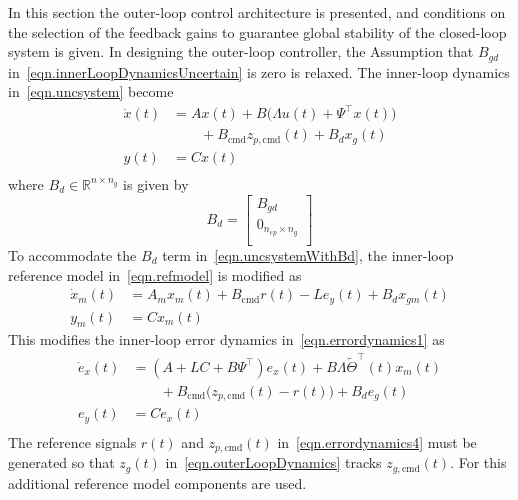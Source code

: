 \documentclass[journal]{IEEEtran}
\theoremstyle{innercustomthm}
\begin{document}
  In this section the outer-loop control architecture is presented, and conditions on the selection of the feedback gains to guarantee global stability of the closed-loop system is given.
  In designing the outer-loop controller, the Assumption that $B_{gd}$ in\ \eqref{eqn.innerLoopDynamicsUncertain} is zero is relaxed.
  The inner-loop dynamics in\ \eqref{eqn.uncsystem} become
  {%
    \small
    \begin{equation}
      \label{eqn.uncsystemWithBd}
      \begin{split}
        \dot{x}(t) &= Ax(t) + B\bigr(\Lambda u(t)+\Psi^{\top}x(t)\bigr) \\
        & \qquad +B_{\text{cmd}}z_{p,\text{cmd}}(t) + B_{d}x_{g}(t) \\
        y(t) &= Cx(t) \\
      \end{split}
    \end{equation}
  }%
  where $B_{d}\in\mathbb{R}^{n\times n_{g}}$ is given by
  \begin{equation*}
    B_{d} =
    \begin{bmatrix}
      B_{gd} \\
      0_{n_{ep}\times n_{g}} \\
    \end{bmatrix}
  \end{equation*}
  To accommodate the $B_{d}$ term in\ \eqref{eqn.uncsystemWithBd}, the inner-loop reference model in\ \eqref{eqn.refmodel} is modified as
  {%
    \small
    \begin{equation}
      \label{eqn.refmodelWithBd}
      \begin{split}
        \dot{x}_{m}(t) &= A_{m}x_{m}(t) + B_{\text{cmd}}r(t) - Le_{y}(t) + B_{d}x_{gm}(t) \\
        y_{m}(t) &= Cx_{m}(t)
      \end{split}
    \end{equation}
  }%
  This modifies the inner-loop error dynamics in\ \eqref{eqn.errordynamics1} as
  {%
  \small
    \begin{equation}
      \label{eqn.errordynamics4}
      \begin{split}
        \dot{e}_{x}(t) &= (A+LC+B\Psi^{\top})e_{x}(t)+B\Lambda\widetilde{\Theta}^{\top}(t)x_{m}(t) \\
        &\qquad + B_{\text{cmd}}\bigr(z_{p,\text{cmd}}(t) - r(t)\bigr) + B_{d}e_{g}(t) \\
        e_{y}(t) &= Ce_{x}(t) \\
      \end{split}
    \end{equation}
  }%
  The reference signals $r(t)$ and $z_{p,\text{cmd}}(t)$ in\ \eqref{eqn.errordynamics4} must be generated so that $z_{g}(t)$ in\ \eqref{eqn.outerLoopDynamics} tracks $z_{g,\text{cmd}}(t)$.
  For this additional reference model components are used.
\end{document}
